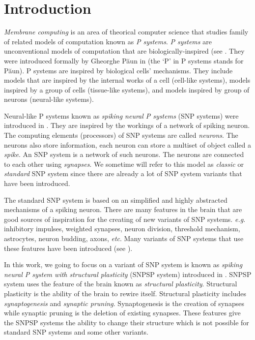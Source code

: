 \documentclass[runningheads,a4paper]{llncs}
\begin{document}



\section{Introduction}

\textit{Membrane computing} is an area of theorical computer science that studies family of related models of computation known as \textit{P systems}.
\textit{P systems} are unconventional models of computation that are biologically-inspired (see \cite{HANDBOOK}. They were introduced formally by 
Gheorghe P\u{a}un in \cite{mc} (the `P' in P systems stands for P\u{a}un). P systems are inspired by biological cells' mechanisms. They include models
that are inspired by the internal works of a cell (cell-like systems), models inspired by a group of cells (tissue-like systems), and models inspired 
by group of neurons (neural-like systems).


Neural-like P systems known as \textit{spiking neural P systems} (SNP systems) were introduced in \cite{SNP}. They are inspired by the workings of a
network of spiking neuron. The computing elements (processors) of SNP systems are called \textit{neurons}. The neurons also store information, each
neuron can store a multiset of object called a \textit{spike}. An SNP system is a network of such neurons. The neurons are connected to each other 
using \textit{synapses}. We sometime will refer to this model as \textit{classic} or \textit{standard} SNP system since there are already a lot of
SNP system variants that have been introduced.

The standard SNP system is based on an simplified and highly abstracted mechanisms of a spiking neuron. There are many features in the brain that are 
good sources of inspiration for the creating of new variants of SNP systems. \textit{e.g.} inhibitory impulses, weighted synapses, neuron division, 
threshold mechanism, astrocytes, neuron budding, axons, \emph{etc}. Many variants of SNP systems that use these features have been introduced (see 
\cite{pan-snpweight-2012,paun-astroc-snp-2007,song-snp-syn-2014,wang-snpweights-2010,pan-anti-snp-2009,pan-astro-snp-2012,wu-cellsnp-2016,SNPwT,song-pan-rulsyn-maxspik-2015,AXONP}).

In this work, we going to focus on a variant of SNP system is known as \textit{spiking neural P system with structural plasticity} (SNPSP system) 
introduced in \cite{SNPSP}. SNPSP system uses the feature of the brain known as  \textit{structural plasticity}. Structural plasticity is the ability
of the brain to rewire itself. Structural plasticity includes \textit{synaptogenesis} and \textit{synaptic pruning}. Synaptogenesis is the creation of 
synapses while synaptic pruning is the deletion of existing synapses. These features give the SNPSP systems the ability to change their structure 
which is not possible for standard SNP systems and some other variants.
\end{document}
